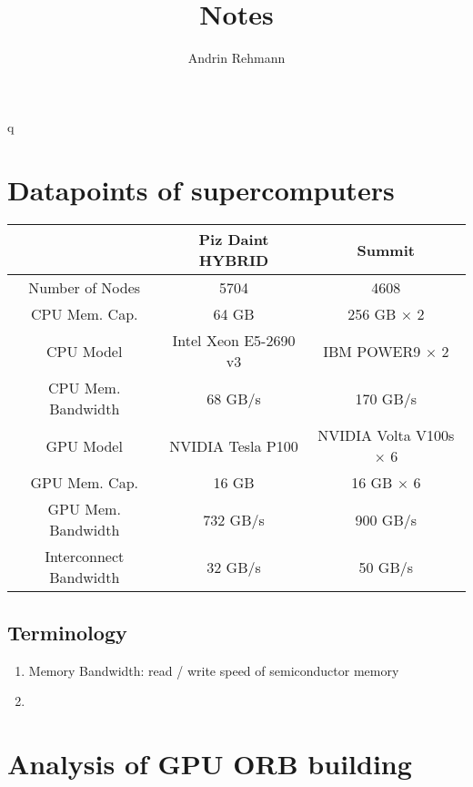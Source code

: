 \documentclass[]{article}
\title{Notes}
\author{Andrin Rehmann}
\begin{document}
q

\maketitle

\section{Datapoints of supercomputers}

\begin{center}
	\begin{tabular}{ c c c }
		& Piz Daint HYBRID \cite{piz_daint} & Summit \\ 
		\hline
		Number of Nodes & 5704 & 4608\\
		CPU Mem. Cap. & 64 GB & 256 GB $\times$ 2  \\   
		CPU Model & Intel Xeon E5-2690 v3 & IBM POWER9 $\times$ 2 \\
		CPU Mem. Bandwidth  & 68 GB/s & 170 GB/s\\
		GPU Model & NVIDIA Tesla P100 & NVIDIA Volta V100s $\times$ 6 \\
		GPU Mem. Cap. & 16 GB & 16 GB $\times$ 6\\
		GPU Mem. Bandwidth & 732 GB/s & 900 GB/s \\
		Interconnect Bandwidth & 32 GB/s & 50 GB/s \\
	\end{tabular}
\end{center}

\subsection{Terminology}

\begin{enumerate}
	\item Memory Bandwidth: read / write speed of semiconductor memory
	\item 

\end{enumerate}

\section{Analysis of GPU ORB building}
\end{document}
